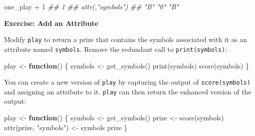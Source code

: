 \documentclass[
  letterpaper,
  DIV=11,
  numbers=noendperiod]{scrbook}
\newenvironment{Shaded}{\begin{snugshade}}{\end{snugshade}}
\newcommand{\ControlFlowTok}[1]{\textcolor[rgb]{0.00,0.23,0.31}{\textbf{#1}}}
\newcommand{\DecValTok}[1]{\textcolor[rgb]{0.68,0.00,0.00}{#1}}
\newcommand{\DocumentationTok}[1]{\textcolor[rgb]{0.37,0.37,0.37}{\textit{#1}}}
\newcommand{\FunctionTok}[1]{\textcolor[rgb]{0.28,0.35,0.67}{#1}}
\newcommand{\NormalTok}[1]{\textcolor[rgb]{0.00,0.23,0.31}{#1}}
\newcommand{\OtherTok}[1]{\textcolor[rgb]{0.00,0.23,0.31}{#1}}
\newcommand{\SpecialCharTok}[1]{\textcolor[rgb]{0.37,0.37,0.37}{#1}}
\newcommand{\StringTok}[1]{\textcolor[rgb]{0.13,0.47,0.30}{#1}}
\begin{document}
\begin{Shaded}
\begin{Highlighting}[]
\NormalTok{one\_play }\SpecialCharTok{+} \DecValTok{1}
\DocumentationTok{\#\#  1}
\DocumentationTok{\#\# attr(,"symbols")}
\DocumentationTok{\#\#  "B" "0" "B"}
\end{Highlighting}
\end{Shaded}

\begin{tcolorbox}[enhanced jigsaw, left=2mm, breakable, colback=white, colframe=quarto-callout-color-frame, leftrule=.75mm, bottomrule=.15mm, arc=.35mm, opacityback=0, rightrule=.15mm, toprule=.15mm]

\vspace{-3mm}\textbf{Exercise: Add an Attribute}\vspace{3mm}

Modify \texttt{play} to return a prize that contains the symbols
associated with it as an attribute named \texttt{symbols}. Remove the
redundant call to \texttt{print(symbols)}:

\begin{Shaded}
\begin{Highlighting}[]
\NormalTok{play }\OtherTok{\textless{}{-}} \ControlFlowTok{function}\NormalTok{() \{}
\NormalTok{  symbols }\OtherTok{\textless{}{-}} \FunctionTok{get\_symbols}\NormalTok{()}
  \FunctionTok{print}\NormalTok{(symbols)}
  \FunctionTok{score}\NormalTok{(symbols)}
\NormalTok{\}}
\end{Highlighting}
\end{Shaded}

\end{tcolorbox}

You can create a new version of \texttt{play} by capturing the output of
\texttt{score(symbols)} and assigning an attribute to it. \texttt{play}
can then return the enhanced version of the output:

\begin{Shaded}
\begin{Highlighting}[]
\NormalTok{play }\OtherTok{\textless{}{-}} \ControlFlowTok{function}\NormalTok{() \{}
\NormalTok{  symbols }\OtherTok{\textless{}{-}} \FunctionTok{get\_symbols}\NormalTok{()}
\NormalTok{  prize }\OtherTok{\textless{}{-}} \FunctionTok{score}\NormalTok{(symbols)}
  \FunctionTok{attr}\NormalTok{(prize, }\StringTok{"symbols"}\NormalTok{) }\OtherTok{\textless{}{-}}\NormalTok{ symbols}
\NormalTok{  prize}
\NormalTok{\}}
\end{Highlighting}
\end{Shaded}
\end{document}
